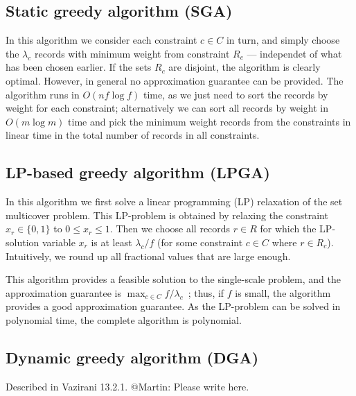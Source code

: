 \subsection{Static greedy algorithm (SGA)}

In this algorithm we consider each constraint $c \in C$ in turn, and simply choose the $\lambda_c$ records with minimum weight from constraint $R_c$ --- independet of what has been chosen earlier. If the sets $R_c$ are disjoint, the algorithm is clearly optimal. However, in general no approximation guarantee can be provided. The algorithm runs in $O(n f \log f)$ time, as we just need to sort the records by weight for each constraint; alternatively we can sort all records by weight in $O(m \log m)$ time and pick the minimum weight records from the constraints in linear time in the total number of records in all constraints.

\subsection{LP-based greedy algorithm (LPGA)}

In this algorithm we first solve a linear programming (LP) relaxation of the set multicover problem. This LP-problem is obtained by relaxing the constraint $x_r \in \{0, 1\}$ to $0 \leq x_r \leq 1$. Then we choose all records $r \in R$ for which the LP-solution variable $x_r$ is at least $\lambda_c / f$ (for some constraint $c \in C$ where $r \in R_c$). Intuitively, we round up all fractional values that are large enough. 

This algorithm provides a feasible solution to the single-scale problem, and the approximation guarantee is $\max_{c \in C} f / \lambda_c$~\cite{something}; thus, if $f$ is small, the algorithm provides a good approximation guarantee. As the LP-problem can be solved in polynomial time, the complete algorithm is polynomial.

\subsection{Dynamic greedy algorithm (DGA)}

Described in Vazirani 13.2.1. @Martin: Please write here.


